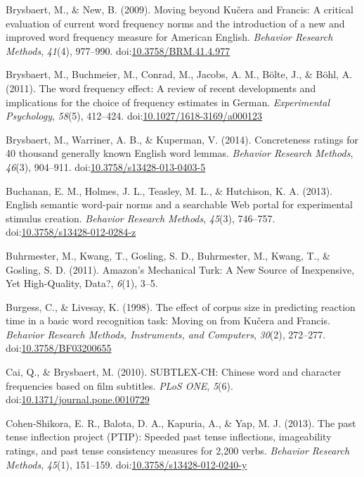 \documentclass[english,man]{apa6}
\theoremstyle{definition}
\theoremstyle{definition}
\theoremstyle{definition}
\theoremstyle{remark}
\begin{document}
\hypertarget{ref-Brysbaert2009}{}
Brysbaert, M., \& New, B. (2009). Moving beyond Kučera and Francis: A
critical evaluation of current word frequency norms and the introduction
of a new and improved word frequency measure for American English.
\emph{Behavior Research Methods}, \emph{41}(4), 977--990.
doi:\href{https://doi.org/10.3758/BRM.41.4.977}{10.3758/BRM.41.4.977}

\hypertarget{ref-Brysbaert2011}{}
Brysbaert, M., Buchmeier, M., Conrad, M., Jacobs, A. M., Bölte, J., \&
Böhl, A. (2011). The word frequency effect: A review of recent
developments and implications for the choice of frequency estimates in
German. \emph{Experimental Psychology}, \emph{58}(5), 412--424.
doi:\href{https://doi.org/10.1027/1618-3169/a000123}{10.1027/1618-3169/a000123}

\hypertarget{ref-Brysbaert2013}{}
Brysbaert, M., Warriner, A. B., \& Kuperman, V. (2014). Concreteness
ratings for 40 thousand generally known English word lemmas.
\emph{Behavior Research Methods}, \emph{46}(3), 904--911.
doi:\href{https://doi.org/10.3758/s13428-013-0403-5}{10.3758/s13428-013-0403-5}

\hypertarget{ref-Buchanan2013}{}
Buchanan, E. M., Holmes, J. L., Teasley, M. L., \& Hutchison, K. A.
(2013). English semantic word-pair norms and a searchable Web portal for
experimental stimulus creation. \emph{Behavior Research Methods},
\emph{45}(3), 746--757.
doi:\href{https://doi.org/10.3758/s13428-012-0284-z}{10.3758/s13428-012-0284-z}

\hypertarget{ref-Buhrmester2011}{}
Buhrmester, M., Kwang, T., Gosling, S. D., Buhrmester, M., Kwang, T., \&
Gosling, S. D. (2011). Amazon's Mechanical Turk: A New Source of
Inexpensive, Yet High-Quality, Data?, \emph{6}(1), 3--5.

\hypertarget{ref-Burgess1998}{}
Burgess, C., \& Livesay, K. (1998). The effect of corpus size in
predicting reaction time in a basic word recognition task: Moving on
from Kučera and Francis. \emph{Behavior Research Methods, Instruments,
and Computers}, \emph{30}(2), 272--277.
doi:\href{https://doi.org/10.3758/BF03200655}{10.3758/BF03200655}

\hypertarget{ref-Cai2010}{}
Cai, Q., \& Brysbaert, M. (2010). SUBTLEX-CH: Chinese word and character
frequencies based on film subtitles. \emph{PLoS ONE}, \emph{5}(6).
doi:\href{https://doi.org/10.1371/journal.pone.0010729}{10.1371/journal.pone.0010729}

\hypertarget{ref-Cohen-Shikora2013}{}
Cohen-Shikora, E. R., Balota, D. A., Kapuria, A., \& Yap, M. J. (2013).
The past tense inflection project (PTIP): Speeded past tense
inflections, imageability ratings, and past tense consistency measures
for 2,200 verbs. \emph{Behavior Research Methods}, \emph{45}(1),
151--159.
doi:\href{https://doi.org/10.3758/s13428-012-0240-y}{10.3758/s13428-012-0240-y}
\end{document}
